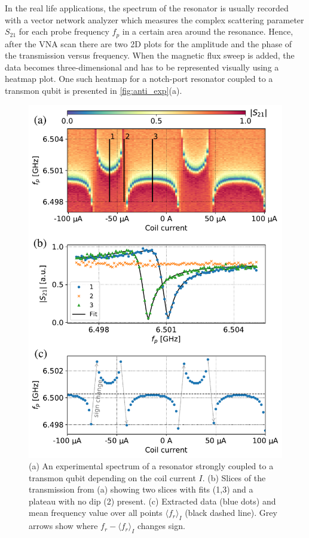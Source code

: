 \documentclass[%
 aip,
 amsmath,amssymb,
 reprint,%
]{revtex4-1}
\begin{document}
In the real life applications, the spectrum of the resonator is usually recorded with a vector network analyzer which measures the complex scattering parameter $S_{21}$ for each probe frequency $f_p$ in a certain area around the resonance. Hence, after the VNA scan there are two 2D plots for the amplitude and the phase of the transmission versus frequency. When the magnetic flux sweep is added, the data becomes three-dimensional and has to be represented  visually using a heatmap plot. One such heatmap for a notch-port resonator coupled to a transmon qubit is presented in \autoref{fig:anti_exp}(a).
\begin{figure}[h!]
\includegraphics[width=\linewidth]{anti_subplots}
\caption{(a) An experimental spectrum of a resonator strongly coupled to a transmon qubit depending on the coil current $I$. (b) Slices of the transmission from (a) showing two slices with fits (1,3) and a plateau with no dip (2) present. (c) Extracted data (blue dots) and mean frequency value over all points $\langle f_r \rangle_{I}$ (black dashed line). Grey arrows show where $f_r - \langle f_r \rangle_{I}$ changes sign.}
\label{fig:anti_exp}
\end{figure}
\end{document}

